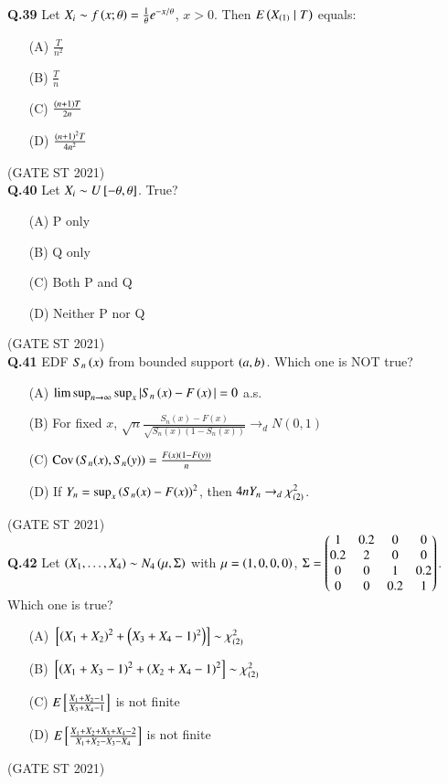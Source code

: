 \documentclass[journal,12pt,onecolumn]{IEEEtran}
\theoremstyle{remark}
\begin{document}
\textbf{Q.39}
Let $X_i \sim f\left(x;\theta\right) = \frac{1}{\theta} e^{-x/\theta}$, $x>0$. Then $E\left(X_{\left(1\right)} \mid T\right)$ equals:
\begin{enumerate}
\item[(A)] $\frac{T}{n^2}$

\item[(B)] $\frac{T}{n}$
\item[(C)] $\frac{\left(n+1\right)T}{2n}$
\item[(D)] $\frac{\left(n+1\right)^2T}{4n^2}$
\end{enumerate}
\hfill (GATE ST 2021) \\

\textbf{Q.40}
Let $X_i \sim U{}\left[-\theta,\theta\right]$. True?
\begin{enumerate}
\item[(A)] P only
\item[(B)] Q only
\item[(C)] Both P and Q
\item[(D)] Neither P nor Q
\end{enumerate}
\hfill (GATE ST 2021) \\
\textbf{Q.41}
EDF $S_n\left(x\right)$ from bounded support $\left(a,b\right)$. Which one is NOT true?
\begin{enumerate}
\item[(A)] $\limsup_{n\to\infty} \sup_x |S_n\left(x\right)-F\left(x\right)| = 0$ a.s.
\item[(B)] For fixed $x$, $\sqrt{n}\frac{S_n(x)-F(x)}{\sqrt{S_n(x)(1-S_n(x))}} \to_d N(0,1)$
\item[(C)] $\text{Cov}\left(S_n(x), S_n(y)\right) = \frac{F\left(x\right)\left(1-F\left(y\right)\right)}{n}$
\item[(D)] If $Y_n = \sup_x \left(S_n(x)-F(x)\right)^2$, then $4n Y_n \to_d \chi^2_{\left(2\right)}$.
\end{enumerate}
\hfill (GATE ST 2021) \\


\textbf{Q.42}
Let $\left(X_1,\dots,X_4\right) \sim N_4\left(\mu,\Sigma\right)$ with  
$\mu = \left(1,0,0,0\right)$, $\Sigma = \begin{pmatrix} 1 & 0.2 & 0 & 0 \\ 0.2 & 2 & 0 & 0 \\ 0 & 0 & 1 & 0.2 \\ 0 & 0 & 0.2 & 1 \end{pmatrix}$.  
Which one is true?
\begin{enumerate}
\item[(A)] ${}\left[\left(X_1+X_2\right)^2 + \left(X_3+X_4-1)^2\right)\right] \sim \chi^2_{(2)}$
\item[(B)] ${}\left[\left(X_1+X_3-1\right)^2 + \left(X_2+X_4-1\right)^2\right]\sim \chi^2_{(2)}$
\item[(C)] $E{}\left[\frac{X_1+X_2-1}{X_3+X_4-1}\right]$ is not finite
\item[(D)] $E{}\left[ \frac{X_1+X_2+X_3+X_4-2}{X_1+X_2-X_3-X_4} \right]$ is not finite
\end{enumerate}
\hfill (GATE ST 2021) \\
\end{document}
